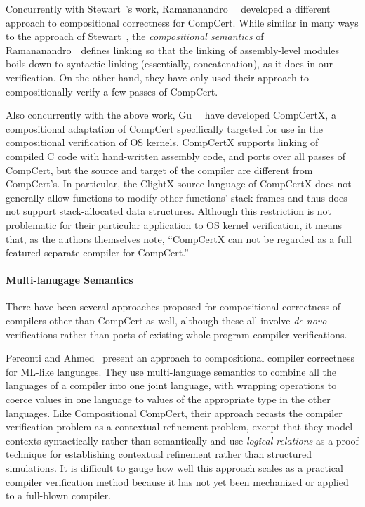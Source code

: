 Concurrently with Stewart~\etal's work, Ramananandro~\etal~\cite{ramananandro+:cpp2015}
developed a different approach to compositional correctness for
CompCert.  While similar in many ways to the approach of
Stewart~\etal, the \emph{compositional semantics} of
Ramananandro~\etal\ defines linking so that the linking of
assembly-level modules boils down to syntactic linking (essentially,
concatenation), as it does in our verification.  On the other hand, they
have only used their approach to compositionally verify a few passes
of CompCert.

Also concurrently with the above work, Gu~\etal~\cite{gu+:popl2015} have
developed CompCertX, a compositional adaptation of CompCert
specifically targeted for use in the compositional verification of OS
kernels.  CompCertX supports linking of compiled C code with
hand-written assembly code, and ports over all passes of CompCert, but
the source and target of the compiler are different from CompCert's.
In particular, the ClightX source language of CompCertX does not
generally allow functions to modify other functions' stack frames and
thus does not support stack-allocated data structures.  Although this
restriction is not problematic for their particular application to OS
kernel verification, it means that, as the authors themselves note,
``CompCertX can not be regarded as a full featured separate compiler
for CompCert.''

\paragraph{Multi-lanugage Semantics}

There have been several approaches proposed for compositional
correctness of compilers other than CompCert as well, although these
all involve \emph{de novo} verifications rather than ports of existing
whole-program compiler verifications.

Perconti and Ahmed~\cite{perconti+:esop14}  present an approach to compositional
compiler correctness for ML-like languages.  They use multi-language
semantics to combine all the languages of a compiler into one joint
language, with wrapping operations to coerce values in one language to
values of the appropriate type in the other languages.  Like
Compositional CompCert, their approach recasts the compiler
verification problem as a contextual refinement problem, except that
they model contexts syntactically rather than semantically and use
\emph{logical relations} as a proof technique for establishing
contextual refinement rather than structured simulations.  It is
difficult to gauge how well this approach scales as a practical
compiler verification method because it has not yet been mechanized or
applied to a full-blown compiler.

